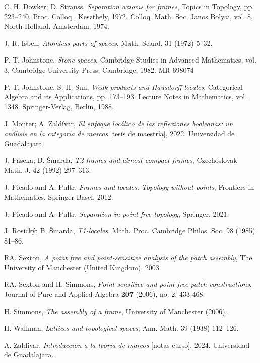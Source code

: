 \documentclass{comunicaciones}
\begin{document}
\noindent 
\begin{thebibliography}{99}
   C. H. Dowker; D. Strauss, \textit{Separation axioms for frames}, Topics in Topology, pp. 223–240. Proc. Colloq., Keszthely, 1972. Colloq. Math. Soc. Janos Bolyai, vol. 8, North-Holland, Amsterdam, 1974.

   J. R. Isbell, \textit{Atomless parts of spaces}, Math. Scand. 31 (1972) 5–32.

   P. T. Johnstone, \textit{Stone spaces}, Cambridge Studies in Advanced Mathematics, vol. 3, Cambridge University Press, Cambridge, 1982. MR 698074

   P. T. Johnstone; S.-H. Sun, \textit{Weak products and Hausdorff locales}, Categorical Algebra and its Applications, pp. 173–193. Lecture Notes in Mathematics, vol. 1348. Springer-Verlag, Berlin, 1988.

   J. Monter; A. Zaldívar, \textit{El enfoque locálico de las reflexiones booleanas: un análisis en la categoría de marcos} [tesis de maestría], 2022. Universidad de Guadalajara.

  J. Paseka; B. Šmarda, \textit{T2-frames and almost compact frames}, Czechoslovak Math. J. 42 (1992) 297–313.
  
   J. Picado and A. Pultr, \textit{Frames and locales: Topology without points}, Frontiers in Mathematics, Springer Basel, 2012.
  
   J. Picado and A. Pultr, \textit{Separation in point-free topology}, Springer, 2021.
  
   J. Rosický; B. Šmarda, \textit{T1-locales}, Math. Proc. Cambridge Philos. Soc. 98 (1985) 81–86.
  
   RA. Sexton, \textit{A point free and point-sensitive analysis of the patch assembly}, The University of Manchester (United Kingdom), 2003.

   RA. Sexton and H. Simmons, \textit{Point-sensitive and point-free patch constructions}, Journal of Pure and Applied Algebra \textbf{207} (2006), no. 2, 433-468.
    
   H. Simmons, \textit{The assembly of a frame}, University of Manchester (2006).

   H. Wallman, \textit{Lattices and topological spaces}, Ann. Math. 39 (1938) 112–126.
  
   A. Zaldívar, \textit{Introducción a la teoría de marcos} [notas curso], 2024. Universidad de Guadalajara.
\end{thebibliography}
\end{document}
